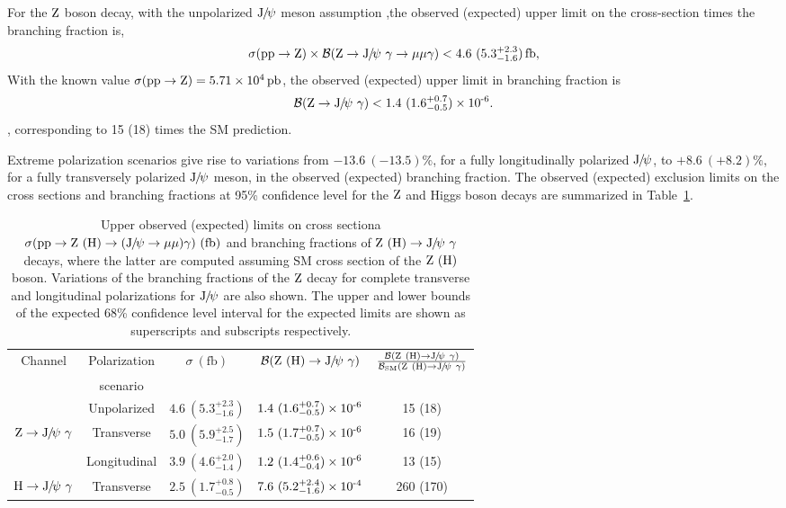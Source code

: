 For the $\mathrm{Z}$ boson decay, with the unpolarized ${\mathrm{J}\hspace{-.08em}/\hspace{-.14em}\psi}$ meson assumption ,the observed (expected) upper limit on the cross-section times the branching fraction is,
\begin{equation}
	\displaystyle
	\sigma(\Pp\Pp\to\cPZ)\times\mathcal{B}(\cPZ\to\JPsi\ \gamma\to\mu\mu\gamma)<4.6\ (5.3^{+2.3}_{-1.6})\fb,
	\end{equation}
With the known value $\sigma(\mathrm{p}\mathrm{p}\to\mathrm{Z})=5.71\times10^{4}\mbox{\ensuremath{\,\text{pb}}}$, the observed (expected) upper limit in branching fraction is 
\begin{equation}
	\displaystyle
	\mathcal{B}(\cPZ\to\JPsi\ \gamma)<1.4\ (1.6^{+0.7}_{-0.5})\ten{-6}.
	\end{equation}
, corresponding to 15 (18) times the SM prediction. 

Extreme polarization scenarios give rise to variations from $-13.6\ (-13.5)\%$, for a fully longitudinally polarized ${\mathrm{J}\hspace{-.08em}/\hspace{-.14em}\psi}$, to $+8.6\ (+8.2)\%$, for a fully transversely polarized ${\mathrm{J}\hspace{-.08em}/\hspace{-.14em}\psi}$ meson, in the observed (expected) branching fraction.
The observed (expected) exclusion limits on the cross sections and branching fractions at 95\% confidence level for the $\mathrm{Z}$ and Higgs boson decays are summarized in Table~\ref{tab:limits_summary}.   

\begin{table}[!ht]
\small
  \setlength{\tabcolsep}{10pt} %
  \renewcommand{\arraystretch}{1.3} %
  \begin{center}
    \begin{tabular}{ ccccc }
    Channel & Polarization & $\sigma\ (\text{fb})$ & $\mathcal{B}(\cPZ\ (\PH)\to\JPsi\ \gamma)$ & $\frac{\mathcal{B}(\cPZ\ (\PH)\to\JPsi\ \gamma)}{\mathcal{B}_{\text{SM}}(\cPZ\ (\PH)\to\JPsi\ \gamma)}$\\
    & scenario & & &\\ 
      \hline
      & Unpolarized & $4.6\ (5.3^{+2.3}_{-1.6})$ & $1.4\ (1.6^{+0.7}_{-0.5})\ten{-6}$ & 15 (18) \\
      $\cPZ\to\JPsi\ \gamma$ & Transverse & $5.0\ (5.9^{+2.5}_{-1.7})$ & $1.5\ (1.7^{+0.7}_{-0.5})\ten{-6}$ & 16 (19) \\
      & Longitudinal & $3.9\ (4.6^{+2.0}_{-1.4})$ & $1.2\ (1.4^{+0.6}_{-0.4})\ten{-6}$ & 13 (15) \\
      \hline
      $\PH\to\JPsi\ \gamma$ & Transverse & $2.5\ (1.7^{+0.8}_{-0.5})$ & $7.6\ (5.2^{+2.4}_{-1.6})\ten{-4}$ & 260 (170) \\
      \hline
    \end{tabular}
    \caption{Upper observed (expected) limits on cross sectiona $\sigma (\Pp\Pp\to\cPZ\ (\PH)\to(\JPsi\to\mu\mu)\gamma)\ (\text{fb})$ and branching fractions of $\cPZ\ (\PH)\to\JPsi\ \gamma$ decays, where the latter are computed assuming SM cross section of the $\mathrm{Z}\ (\mathrm{H})$ boson. Variations of the branching fractions of the $\mathrm{Z}$ decay for complete transverse and longitudinal polarizations for ${\mathrm{J}\hspace{-.08em}/\hspace{-.14em}\psi}$ are also shown. The upper and lower bounds of the expected 68\% confidence level interval for the expected limits are shown as superscripts and subscripts respectively.   \label{tab:limits_summary}}
  \end{center}
\end{table}

